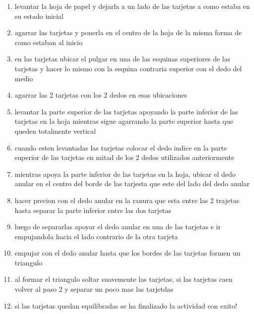 \documentclass{article}
\begin{document}
\begin{enumerate}
    \vspace{0.8cm}
    \item levantar la hoja de papel y dejarla a un lado de las tarjetas a como estaba en su estado inicial
    \item agarrar las tarjetas y ponerla en el centro de la hoja de la misma forma de como estaban al inicio
    \item en las tarjetas ubicar el pulgar en una de las esquinas superiores de las tarjetas  y hacer lo mismo con la esquina contraria superior con el dedo del medio 
    \item agarrar las 2 tarjetas con los 2 dedos en esas ubicaciones
    \item levantar la parte superior de las tarjetas apoyando la parte inferior de las tarjetas en la hoja mientras sigue agarrando la parte superior hasta que queden totalmente vertical
    \item cuando esten levantadas las tarjetas colocar el dedo indice en la parte superior de las tarjetas en mitad de los 2 dedos utilizados anteriormente
    \item mientras apoya la parte inferior de las tarjetas en la hoja, ubicar el dedo anular en el centro del borde de las tarjesta que este del lado del dedo anular
    \item hacer precion con el dedo anular en la ranura  que esta entre las 2 trajetas hasta separar la parte inferior entre las dos tarjetas 
    \item luego de separarlas apoyar el dedo anular en una de las tarjetas e ir empujandola hacia el lado contrario de la otra tarjeta 
    \item empujar con el dedo anular hasta que los bordes de las tarjetas formen un triangulo 
    \item al formar el triangulo soltar suavemente las tarjetas, si las tarjetas caen volver al paso 2 y separar un poco mas las tarjetdas
    \item si las tarjetas quedan equilibradas se ha finalizado la actividad con exito!
\end{enumerate}
\end{document}

